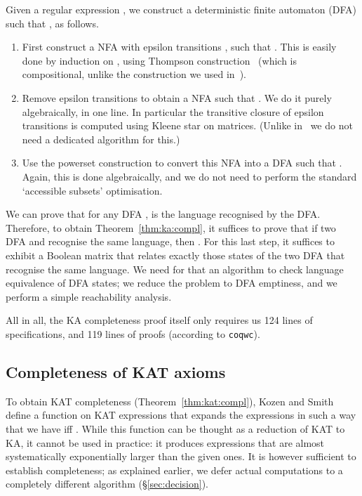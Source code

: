 \documentclass[a4paper]{llncs}
\begin{document}
Given a regular expression , we construct a deterministic finite
automaton (DFA)  such that , as
follows.
\begin{enumerate}
\item First construct a NFA with epsilon transitions ,
  such that . This is easily done by
  induction on , using Thompson construction~\cite{thompson68}
  (which is compositional, unlike the construction we used
  in~\cite{bp:itp10:kacoq}).
\item Remove epsilon transitions to obtain a NFA  such
  that . We do it purely
  algebraically, in one line. In particular the transitive closure of
  epsilon transitions is computed using Kleene star on
  matrices. (Unlike in~\cite{bp:itp10:kacoq} we do not need a
  dedicated algorithm for this.)
\item Use the powerset construction to convert this NFA into a DFA
   such that . Again, this is done algebraically, and we do not need to
  perform the standard `accessible subsets' optimisation.
\end{enumerate}
We can prove that for any DFA ,  is the
language recognised by the DFA. Therefore, to obtain
Theorem~\ref{thm:ka:compl}, it suffices to prove that if two DFA
 and  recognise the same language, then .
For this last step, it suffices to exhibit a Boolean matrix that
relates exactly those states of the two DFA that recognise the same
language. We need for that an algorithm to check language equivalence
of DFA states; we reduce the problem to DFA emptiness, and we perform a simple
reachability analysis.


\medskip

All in all, the KA completeness proof itself only requires us 124 lines
of specifications, and 119 lines of proofs (according to \texttt{coqwc}).

\subsection{Completeness of KAT axioms}
\label{ssec:kat:completeness}

To obtain KAT completeness (Theorem~\ref{thm:kat:compl}), Kozen and
Smith~\cite{kozens96:kat:completeness:decidability} define a function
 on KAT expressions that expands the expressions in such a
way that we have  iff .
While this function can be thought as a reduction of KAT to KA, it
cannot be used in practice: it produces expressions that are almost
systematically exponentially larger than the given ones. It is however
sufficient to establish completeness; as explained earlier, we defer
actual computations to a completely different algorithm
(§\ref{sec:decision}).
\end{document}
